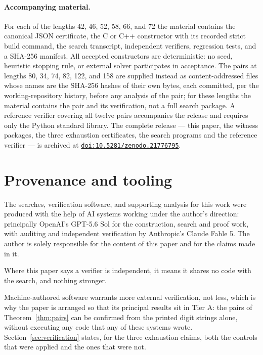 \documentclass[11pt]{article}
\begin{document}
\paragraph{Accompanying material.}
For each of the lengths 42, 46, 52, 58, 66, and 72 the material contains the
canonical JSON certificate, the C or C++ constructor with its recorded strict
build command, the search transcript, independent verifiers, regression tests,
and a SHA-256 manifest.  All accepted constructors are deterministic: no seed,
heuristic stopping rule, or external solver participates in acceptance.  The
pairs at lengths 80, 34, 74, 82, 122, and 158 are supplied instead as
content-addressed files whose names are the SHA-256 hashes of their own bytes,
each committed, per the working-repository history, before any analysis of the
pair; for these lengths the material
contains the pair and its verification, not a full search package.  A reference
verifier covering all twelve pairs accompanies the release and requires only
the Python standard library.  The complete release --- this paper, the witness
packages, the three exhaustion certificates, the search programs and the
reference verifier --- is archived at
\href{https://doi.org/10.5281/zenodo.21776795}{\texttt{doi:10.5281/zenodo.21776795}}.

\section{Provenance and tooling}
\label{sec:provenance}

The searches, verification software, and supporting analysis for this work were
produced with the help of AI systems working under the author's direction:
principally OpenAI's GPT-5.6 Sol for the construction, search and proof work,
with auditing and independent verification by Anthropic's Claude Fable 5.  The
author is solely responsible for the content of this paper and for the claims
made in it.

Where this paper says a verifier is independent, it means it shares no code
with the search, and nothing stronger.

Machine-authored software warrants more external
verification, not less, which is why the paper is arranged so that its
principal results sit in Tier A: the pairs of Theorem~\ref{thm:pairs} can be
confirmed from the printed digit strings alone, without executing any code that
any of these systems wrote.  Section~\ref{sec:verification} states, for the
three exhaustion claims, both the controls that were applied and the ones that
were not.
\end{document}
